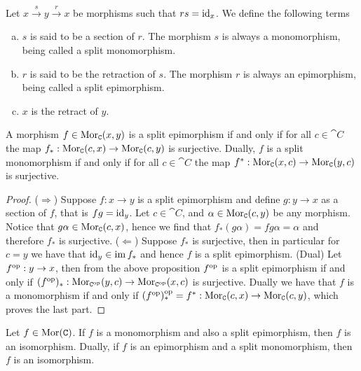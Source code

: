 \begin{definition}
  Let \(x \xrightarrow s y \xrightarrow r x\) be morphisms such that \(r s =
  \operatorname{id}_x\). We define the following terms
  \begin{enumerate}[(a)]\setlength\itemsep{0em}
    \item\label{def: split monomorphism}
      \(s\) is said to be a section of \(r\). The morphism \(s\) is always a
      monomorphism, being called a split monomorphism.
    \item\label{def: split epimorphism}
      \(r\) is said to be the retraction of \(s\). The morphism \(r\) is always
      an epimorphism, being called a split epimorphism.
    \item\label{def: retract}
      \(x\) is the retract of \(y\).
  \end{enumerate}
\end{definition}

\begin{proposition}
  A morphism \(f \in \operatorname{Mor}_{\texttt C}(x, y)\) is a split epimorphism if and only if
  for all \(c \in \cat C\) the map \(f_*: \operatorname{Mor}_{\texttt C}(c, x) \to \operatorname{Mor}_{\texttt
    C}(c, y)\) is surjective. Dually, \(f\) is a split monomorphism if and only
    if for all \(c \in \cat C\) the map \(f^*: \operatorname{Mor}_{\texttt C}(x, c) \to
    \operatorname{Mor}_{\texttt C}(y, c)\) is surjective.
\end{proposition}

\begin{proof}
  (\(\Rightarrow\)) Suppose \(f: x \to y\) is a split epimorphism and define
  \(g: y \to x\) as a section of \(f\), that is \(f g = \operatorname{id}_y\). Let \(c
  \in \cat C\), and \(\alpha \in \operatorname{Mor}_{\texttt C}(c, y)\) be any morphism. Notice
  that \(g \alpha \in \operatorname{Mor}_{\texttt C}(c, x)\), hence we find that \(f_*(g
  \alpha) = f g \alpha = \alpha\) and therefore \(f_*\) is
  surjective. (\(\Leftarrow\)) Suppose \(f_*\) is surjective, then in particular
  for \(c = y\) we have that \(\operatorname{id}_y \in \operatorname{im} f_*\) and hence \(f\) is a split
  epimorphism. (Dual) Let \(f^{\mathrm{op}}: y \to x\), then from the above proposition
  \(f^{\mathrm{op}}\) is a split epimorphism if and only if \((f^{\mathrm{op}})_*: \operatorname{Mor}_{\texttt
  C^{\mathrm{op}}}(y, c) \to \operatorname{Mor}_{\texttt C^{\mathrm{op}}}(x, c)\) is surjective. Dually we have that
  \(f\) is a monomorphism if and only if \((f^{\mathrm{op}})_*^{\mathrm{op}} = f^*: \operatorname{Mor}_{\texttt C}(c,
  x) \to \operatorname{Mor}_{\texttt C}(c, y)\), which proves the last part.
\end{proof}

\begin{proposition}
  Let \(f \in \operatorname{Mor}(\texttt C)\). If \(f\) is a monomorphism and also a split
  epimorphism, then \(f\) is an isomorphism. Dually, if \(f\) is an epimorphism
  and a split monomorphism, then \(f\) is an isomorphism.
\end{proposition}

